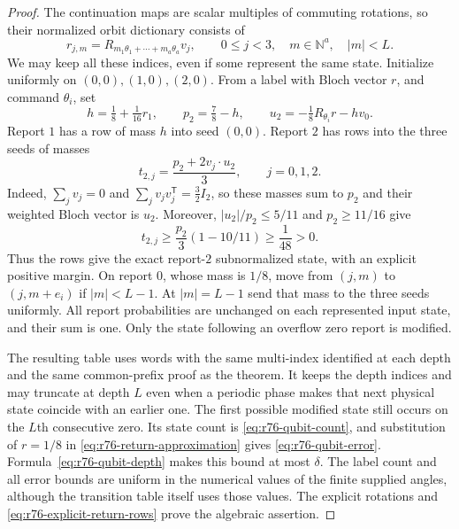 \begin{proof}
The continuation maps are scalar multiples of commuting rotations, so
their normalized orbit dictionary consists of
\begin{equation}\label{eq:r76-qubit-dictionary}
 r_{j,m}=R_{m_1\theta_1+\cdots+m_a\theta_a}v_j,
 \qquad 0\le j<3,\quad m\in\mathbb N^a,\quad |m|<L.
\end{equation}
We may keep all these indices, even if some represent the same state.
Initialize uniformly on $(0,0),(1,0),(2,0)$.  From a label with Bloch
vector $r$, and command $\theta_i$, set
\[
 h=\tfrac18+\tfrac1{16}r_1,\qquad
 p_2=\tfrac78-h,\qquad
 u_2=-\tfrac18 R_{\theta_i}r-hv_0.
\]
Report $1$ has a row of mass $h$ into seed $(0,0)$.  Report $2$ has rows
into the three seeds of masses
\begin{equation}\label{eq:r76-explicit-return-rows}
 t_{2,j}=\frac{p_2+2v_j\mathbin{\cdot}u_2}{3},
 \qquad j=0,1,2.
\end{equation}
Indeed, $\sum_jv_j=0$ and
$\sum_jv_jv_j^{\mathsf T}=\tfrac32I_2$, so these masses sum to $p_2$
and their weighted Bloch vector is $u_2$.  Moreover,
$|u_2|/p_2\le5/11$ and $p_2\ge11/16$ give
\[
 t_{2,j}\ge\frac{p_2}{3}(1-10/11)\ge\frac1{48}>0.
\]
Thus the rows give the exact report-$2$ subnormalized state, with an
explicit positive margin.  On report $0$, whose mass is $1/8$, move
from $(j,m)$ to $(j,m+e_i)$ if $|m|<L-1$.  At $|m|=L-1$ send that mass
to the three seeds uniformly.  All report probabilities are unchanged
on each represented input state, and their sum is one.  Only the state
following an overflow zero report is modified.

The resulting table uses words with the same multi-index identified at
each depth and the same common-prefix proof as the theorem.  It keeps
the depth indices and may truncate at depth $L$ even when a periodic
phase makes that next physical state coincide with an earlier one.
The first possible modified state still occurs on the $L$th consecutive
zero.  Its state count
is \eqref{eq:r76-qubit-count}, and substitution of $r=1/8$ in
\eqref{eq:r76-return-approximation} gives
\eqref{eq:r76-qubit-error}.  Formula~\eqref{eq:r76-qubit-depth} makes
this bound at most $\delta$.  The label count and all error bounds are
uniform in the numerical values of the finite supplied angles, although
the transition table itself uses those values.  The explicit rotations
and \eqref{eq:r76-explicit-return-rows} prove the algebraic assertion.
\end{proof}

